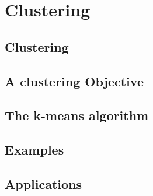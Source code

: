 \section{Clustering}

\subsection{Clustering}
\subsection{A clustering Objective}
\subsection{The k-means algorithm}
\subsection{Examples}
\subsection{Applications}